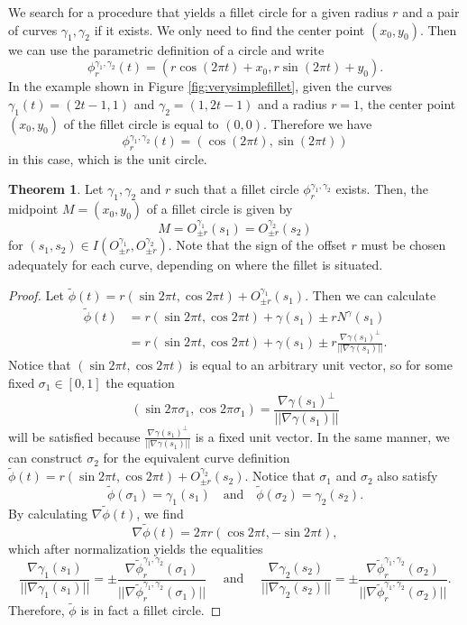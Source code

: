 \documentclass[a4paper, 11pt]{report}
\theoremstyle{definition}
\newtheorem{theorem}[definition]{Theorem}
\begin{document}
	We search for a procedure that yields a fillet circle for a given radius $r$ and a pair of curves $\gamma_1, \gamma_2$ if it exists. We only need to find the center point $(x_0, y_0)$. Then we can use the parametric definition of a circle and write
		$$ \phi^{\gamma_1, \gamma_2}_r(t) = (r \cos(2 \pi t) + x_0, r \sin(2 \pi t) + y_0).$$
	In the example shown in Figure \ref{fig:verysimplefillet}, given the curves $\gamma_1(t) = (2t-1,1)$ and $\gamma_2 = (1,2t-1)$ and a radius $r = 1$, the center point $(x_0,y_0)$ of the fillet circle is equal to $(0,0)$. Therefore we have
		$$ \phi^{\gamma_1, \gamma_2}_r(t) = (\cos(2\pi t), \sin(2\pi t)) $$
	in this case, which is the unit circle.

	\begin{theorem}\label{thm:fillettheorem}
		Let $\gamma_1, \gamma_2$ and $r$ such that a fillet circle $\phi^{\gamma_1, \gamma_2}_r$ exists. Then, the midpoint $M = (x_0, y_0)$ of a fillet circle is given by
			$$ M = O^{\gamma_1}_{\pm r}(s_1) = O^{\gamma_2}_{\pm r}(s_2) $$
		for $(s_1,s_2) \in I(O^{\gamma_1}_{\pm r}, O^{\gamma_2}_{\pm r})$. Note that the sign of the offset $r$ must be chosen adequately for each curve, depending on where the fillet is situated.
	\end{theorem}
	\begin{proof}
		Let $\tilde\phi(t) = r (\sin 2\pi t, \cos 2\pi t) + O^{\gamma_1}_{\pm r}(s_1)$. Then we can calculate
		\begin{align*}
			\tilde\phi(t) 	&= r (\sin 2\pi t, \cos 2\pi t) + \gamma(s_1) \pm rN^\gamma(s_1) \\
							&= r (\sin 2\pi t, \cos 2\pi t) + \gamma(s_1) \pm r\frac{\nabla\gamma(s_1)^\perp}{||\nabla\gamma(s_1)||}.
		\end{align*}
		Notice that $(\sin 2\pi t, \cos 2\pi t)$ is equal to an arbitrary unit vector, so for some fixed $\sigma_1 \in [0,1]$ the equation
			$$(\sin 2\pi \sigma_1, \cos 2\pi \sigma_1) = \frac{\nabla\gamma(s_1)^\perp}{||\nabla\gamma(s_1)||}$$
		will be satisfied because $\frac{\nabla\gamma(s_1)^\perp}{||\nabla\gamma(s_1)||}$ is a fixed unit vector.
		In the same manner, we can construct $\sigma_2$ for the equivalent curve definition $\tilde\phi(t) = r (\sin 2\pi t, \cos 2\pi t) + O^{\gamma_2}_{\pm r}(s_2).$ Notice that $\sigma_1$ and $\sigma_2$ also satisfy
			$$ \tilde\phi(\sigma_1) = \gamma_1(s_1) \quad\text{and}\quad \tilde\phi(\sigma_2) = \gamma_2(s_2).$$
		By calculating $\nabla \tilde\phi(t)$, we find
			$$ \nabla \tilde\phi(t) = 2\pi r (\cos 2\pi t, -\sin 2\pi t), $$
		which after normalization yields the equalities
			$$
				\frac{\nabla \gamma_1(s_1)}{||\nabla \gamma_1(s_1)||} = 
				\pm\frac{\nabla \tilde\phi^{\gamma_1, \gamma_2}_r(\sigma_1)}{||\nabla \tilde\phi^{\gamma_1, \gamma_2}_r(\sigma_1)||} 
				\quad\text{ and }\quad 
				\frac{\nabla \gamma_2(s_2)}{||\nabla \gamma_2(s_2)||} =  
				\pm\frac{\nabla \tilde\phi^{\gamma_1, \gamma_2}_r(\sigma_2)}{||\nabla \tilde\phi^{\gamma_1, \gamma_2}_r(\sigma_2)||}.
			$$
		Therefore, $\tilde \phi$ is in fact a fillet circle.
	\end{proof}
\end{document}
